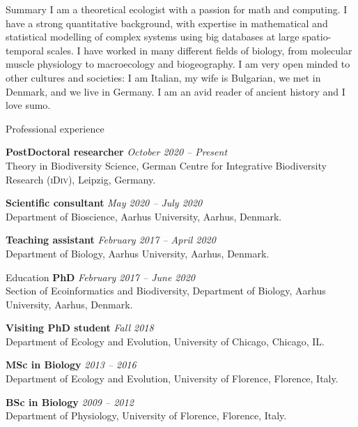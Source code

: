 \documentclass{resume} %
\begin{document}
\begin{rSection}{Summary}
I am a theoretical ecologist with a passion for math and computing. I have a strong quantitative background,
with expertise in mathematical and statistical modelling of complex systems using big databases at large
spatio-temporal scales. I have worked in many different fields of biology, from molecular muscle physiology
to macroecology and biogeography. I am very open minded to other cultures and societies: I am Italian,
my wife is Bulgarian, we met in Denmark, and we live in Germany. I am an avid reader of ancient history
and I love sumo.

\end{rSection}

\begin{rSection}{Professional experience}

{\bf PostDoctoral researcher} \hfill {\em October 2020 -- Present}\\
Theory in Biodiversity Science, German Centre for Integrative Biodiversity Research (\textsc{iDiv}), Leipzig, Germany.

{\bf Scientific consultant} \hfill {\em May 2020 -- July 2020}\\
Department of Bioscience, Aarhus University, Aarhus, Denmark.

{\bf Teaching assistant} \hfill {\em February 2017 -- April 2020}
\\Department of Biology, Aarhus University, Aarhus, Denmark.

\end{rSection}

\begin{rSection}{Education}
{\bf PhD} \hfill {\em February 2017 -- June 2020} \\
Section of Ecoinformatics and Biodiversity, Department of Biology, Aarhus University, Aarhus, Denmark.

{\bf Visiting PhD student} \hfill {\em Fall 2018} \\
Department of Ecology and Evolution, University of Chicago, Chicago, IL.

{\bf MSc in Biology} \hfill {\em 2013 -- 2016} \\
Department of Ecology and Evolution, University of Florence, Florence, Italy.

{\bf BSc in Biology} \hfill {\em 2009 -- 2012} \\
Department of Physiology, University of Florence, Florence, Italy.
\end{rSection}
\end{document}
